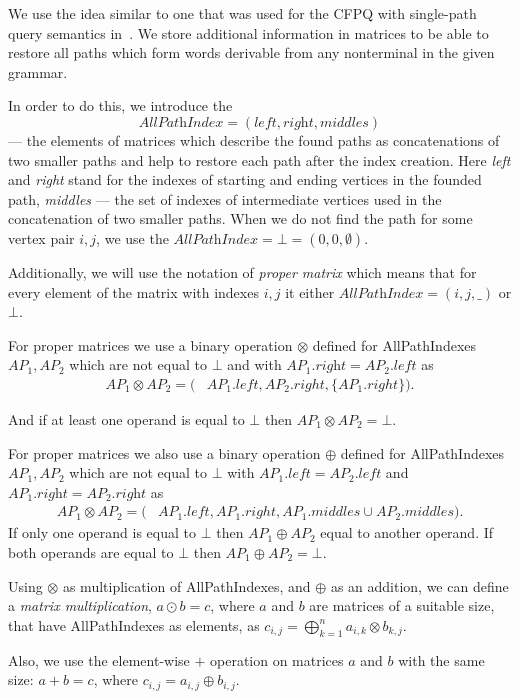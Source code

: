We use the idea similar to one that was used for the CFPQ with single-path query semantics in~\cite{10.1145/3398682.3399163}. We store additional information in matrices to be able to restore all paths which form words derivable from any nonterminal in the given grammar.

In order to do this, we introduce the 
$$\textit{AllPathIndex} = (\textit{left},\textit{right},\textit{middles})$$ 
--- the elements of matrices which describe the found paths as concatenations of two smaller paths and help to restore each path after the index creation. Here \textit{left} and \textit{right} stand for the indexes of starting and ending vertices in the founded path, \textit{middles} --- the set of indexes of intermediate vertices used in the concatenation of two smaller paths. When we do not find the path for some vertex pair $i,j$, we use the $\textit{AllPathIndex} = \bot = (0,0,\emptyset)$.

Additionally, we will use the notation of \textit{proper matrix} which means that for every element of the matrix with indexes $i,j$ it either $\textit{AllPathIndex} = (i,j,\_)$ or $\bot$.

For proper matrices we use a binary operation $\otimes$ defined for AllPathIndexes \mbox{$AP_1, AP_2$} which are not equal to $\bot$ and with $AP_1.\textit{right} = AP_2.\textit{left}$ as
\begin{align*}
	AP_1 \otimes AP_2 = (&AP_1.left, AP_2.right, \{AP_1.right\}).
\end{align*}

And if at least one operand is equal to $\bot$ then $AP_1 \otimes AP_2 = \bot$.

For proper matrices we also use a binary operation $\oplus$ defined for AllPathIndexes \mbox{$AP_1, AP_2$} which are not equal to $\bot$ with $AP_1.\textit{left} = AP_2.\textit{left}$ and $AP_1.\textit{right} = AP_2.\textit{right}$ as
\begin{align*}
	AP_1 \otimes AP_2 = (&AP_1.left, AP_1.right, AP_1.middles \cup AP_2.middles).
\end{align*}
If only one operand is equal to $\bot$ then $AP_1 \oplus AP_2$ equal to another operand. If both operands are equal to $\bot$ then $AP_1 \oplus AP_2 = \bot$.

Using $\otimes$ as multiplication of AllPathIndexes, and $\oplus$ as an addition, we can define a \emph{matrix multiplication}, \mbox{$a \odot b = c$}, where $a$ and $b$ are matrices of a suitable size, that have AllPathIndexes as elements, as $c_{i,j} = \bigoplus^{n}_{k=1}{a_{i,k} \otimes b_{k,j}}.$

Also, we use the element-wise $+$ operation on matrices $a$ and $b$ with the same size: \mbox{$a + b = c$}, where $c_{i,j} = a_{i,j} \oplus b_{i,j}.$
